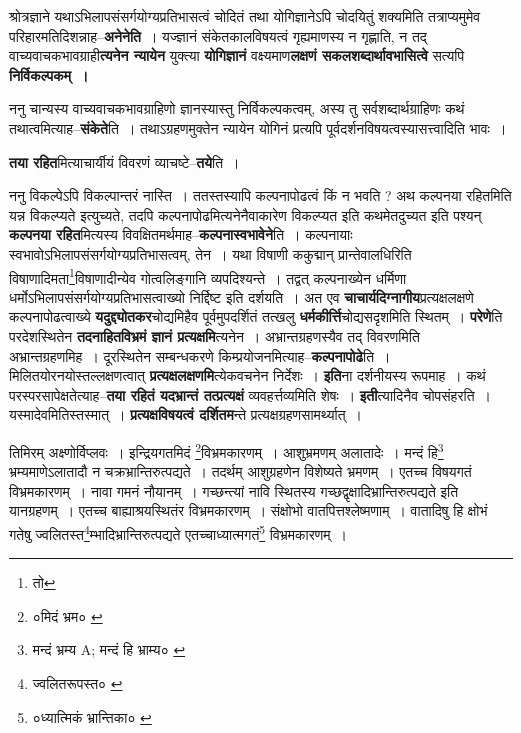 \documentclass[article,12pt,a4paper]{memoir}
\begin{document}
	  \pstart श्रोत्रज्ञाने यथाऽभिलापसंसर्गयोग्यप्रतिभासत्वं चोदितं तथा योगिज्ञानेऽपि चोदयितुं शक्यमिति तत्राप्यमुमेव परिहारमतिदिशन्नाह--\textbf{अनेनेति} । यज्ज्ञानं संकेतकालविषयत्वं गृह्यमाणस्य न गृह्णाति, न तद् वाच्यवाचकभावग्राही\textbf{त्यनेन न्यायेन} युक्त्या \textbf{योगिज्ञानं} वक्ष्यमाण\textbf{लक्षणं सकलशब्दार्थावभासित्वे} सत्यपि \textbf{निर्विकल्पकम् ।}
	\pend
      

	  \pstart ननु चान्यस्य वाच्यवाचकभावग्राहिणो ज्ञानस्यास्तु निर्विकल्पकत्वम्, अस्य तु सर्वशब्दार्थग्राहिणः कथं तथात्वमित्याह--\textbf{संकेते}ति । तथाऽग्रहणमुक्तेन न्यायेन योगिनं प्रत्यपि पूर्वदर्शनविषयत्वस्यासत्त्वादिति भावः ।
	\pend
      

	  \pstart \textbf{तया रहित}मित्याचार्यीयं विवरणं व्याच\leavevmode{}ष्टे--\textbf{तये}ति ।
	\pend
      

	  \pstart ननु विकल्पेऽपि विकल्पान्तरं नास्ति । ततस्तस्यापि कल्पनापोढत्वं किं न भवति ? अथ कल्पनया रहितमिति यन्न विकल्प्यते इत्युच्यते, तदपि कल्पनापोढमित्यनेनैवाकारेण विकल्प्यत इति कथमेतदुच्यत इति पश्यन् \textbf{कल्पनया रहित}मित्यस्य विवक्षितमर्थमाह--\textbf{कल्पनास्वभावेने}ति । कल्पनायाः स्वभावोऽभिलापसंसर्गयोग्यप्रतिभासत्वम्, तेन । यथा विषाणी ककुद्मान् प्रान्तेवालधिरिति विषाणादिमता\footnote{तो}विषाणादीन्येव गोत्वलिङ्गानि व्यपदिश्यन्ते । तद्वत् कल्पनाख्येन धर्मिणा धर्मोऽभिलापसंसर्गयोग्यप्रतिभासत्वाख्यो निर्द्दिष्ट इति दर्शयति । अत एव \textbf{चाचार्यदिग्नागीय}प्रत्यक्षलक्षणे कल्पनापोढत्वाख्ये \textbf{यदुद्द्योतकर}चोद्यमिहैव पूर्वमुपदर्शितं तत्खलु \textbf{धर्मकीर्त्ति}चोद्यसदृशमिति स्थितम् । \textbf{परेणे}ति परदेशस्थितेन \textbf{तदनाहितविभ्रमं ज्ञानं प्रत्यक्षमि}त्यनेन । अभ्रान्तग्रहणस्यैव तद् विवरणमिति अभ्रान्तग्रहणमिह । दूरस्थितेन सम्बन्धकरणे किम्प्रयोजनमित्याह--\textbf{कल्पनापोढे}ति । मिलितयोरनयोस्तल्लक्षणत्वात् \textbf{प्रत्यक्षलक्षणमि}त्येकवचनेन निर्देशः । \textbf{इति}ना दर्शनीयस्य रूपमाह । कथं परस्परसापेक्षतेत्याह--\textbf{तया रहितं यदभ्रान्तं तत्प्रत्यक्षं} व्यवहर्त्तव्यमिति शेषः । \textbf{इती}त्यादिनैव चोपसंहरति । यस्मादेवमितिस्तस्मात् । \textbf{प्रत्यक्षविषयत्वं दर्शितम}न्ते प्रत्यक्षग्रहणसामर्थ्यात् ।
	\pend
      \leavevmode{}
	  \bigskip
	  \begingroup
	

	  \pstart तिमिरम् अक्ष्णोर्विप्लवः । इन्द्रियगतमिदं \footnote{०मिदं भ्रम० \cite{dp-msB}}विभ्रमकारणम् । आशुभ्रमणम् अलातादेः । मन्दं हि\footnote{मन्दं भ्रम्य A; मन्दं हि भ्राम्य० \cite{dp-msC} \cite{dp-msD} \cite{dp-msB} \cite{dp-edN}} भ्रम्यमाणेऽलातादौ न चक्रभ्रान्तिरुत्पद्यते । तदर्थम् आशुग्रहणेन विशेष्यते भ्रमणम् । एतच्च विषयगतं विभ्रमकारणम् । नावा गमनं नौयानम् । गच्छन्त्यां नावि स्थितस्य गच्छद्वृक्षादिभ्रान्तिरुत्पद्यते इति यानग्रहणम् । एतच्च बाह्याश्रयस्थितंर विभ्रमकारणम् । संक्षोभो वातपित्तश्लेष्मणाम् । वातादिषु हि क्षोभं गतेषु ज्वलितस्त\footnote{ज्वलितरूपस्त० \cite{dp-msB} \cite{dp-msD}}म्भादिभ्रान्तिरुत्पद्यते एतच्चाध्यात्मगतं\footnote{०ध्यात्मिकं भ्रान्तिका० \cite{dp-msB} \cite{dp-msD}} विभ्रमकारणम् ।
	\pend
       
\end{document}

